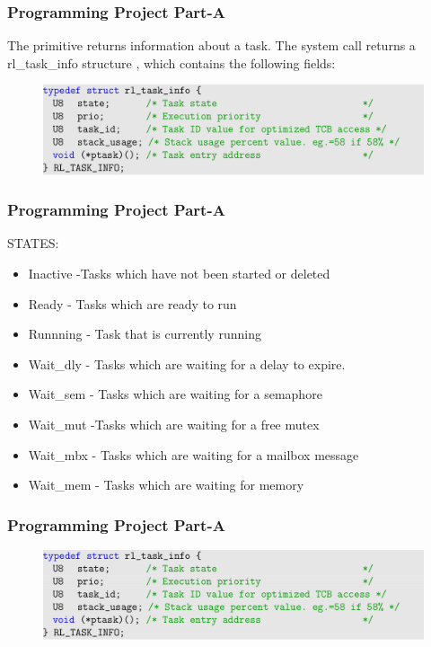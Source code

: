 \documentclass[serif,mathserif]{beamer}
\begin{document}
\begin{frame} [label=firstframe]
\frametitle{Programming Project Part-A}
   The primitive returns information about a task. The system call returns a rl\_task\_info
structure , which contains the following fields: \pause
  \begin{figure}
    \centering
    \includegraphics[width=12cm]{sc.png}
  \end{figure}
\end{frame}


\begin{frame}
\frametitle{Programming Project Part-A}
STATES: \pause
\begin{itemize}
    \item Inactive -Tasks which have not been started or deleted
\item Ready - Tasks which are ready to run
\item Runnning - Task that is currently running
\item Wait\_dly - Tasks which are waiting for a delay to expire.
\item Wait\_sem - Tasks which are waiting for a semaphore
\item Wait\_mut -Tasks which are waiting for a free mutex
\item Wait\_mbx - Tasks which are waiting for a mailbox message 
 \item Wait\_mem - Tasks which are waiting for memory
\end{itemize}
\end{frame}




\begin{frame} [label=firstframe]
\frametitle{Programming Project Part-A}
  \begin{figure}
    \centering
    \includegraphics[width=12cm]{sc.png}
  \end{figure}
\end{frame}
\end{document}
